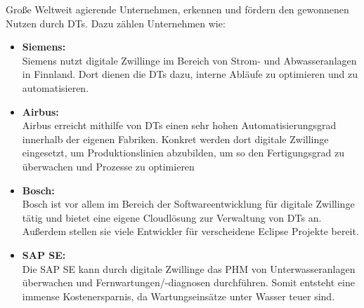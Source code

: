 \pagebreak

Große Weltweit agierende Unternehmen, erkennen und fördern den gewonnenen Nutzen durch \ac{DT}s. Dazu zählen Unternehmen wie:
\begin{itemize}
    \item \textbf{Siemens:}\\ Siemens nutzt digitale Zwillinge im Bereich von Strom- und Abwasseranlagen in Finnland. Dort dienen die \ac{DT}s dazu, interne Abläufe zu optimieren und zu automatisieren.\autocite{tao2018digital}
    \item \textbf{Airbus:}\\ Airbus erreicht mithilfe von \ac{DT}s einen sehr hohen Automatisierungsgrad innerhalb der eigenen Fabriken. Konkret werden dort digitale Zwillinge eingesetzt, um Produktionslinien abzubilden, um so den Fertigungsgrad zu überwachen und Prozesse zu optimieren
    \item \textbf{Bosch:}\\ Bosch ist vor allem im Bereich der Softwareentwicklung für digitale Zwillinge tätig und bietet eine eigene Cloudlösung zur Verwaltung von \ac{DT}s an. Außerdem stellen sie viele Entwickler für verscheidene Eclipse Projekte bereit.
    \item \textbf{SAP SE:}\\ Die SAP SE kann durch digitale Zwillinge das \ac{PHM} von Unterwasseranlagen überwachen und Fernwartungen/-diagnosen durchführen. Somit entsteht eine immense Kostenersparnis, da Wartungseinsätze unter Wasser teuer sind.
\end{itemize}


